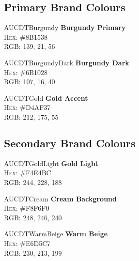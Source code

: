 \documentclass[a4paper, 11pt]{article}
\begin{document}
\subsection{Primary Brand Colours}
\begin{center}
    \begin{tcbraster}[raster columns=3, raster equal height, raster column skip=5mm]
        \begin{colorswatch}{AUCDTBurgundy}
            \textbf{Burgundy Primary} \\ \textsc{Hex:} \#8B1538 \\ \textsc{RGB:} 139, 21, 56
        \end{colorswatch}
        \begin{colorswatch}{AUCDTBurgundyDark}
             \textbf{Burgundy Dark} \\ \textsc{Hex:} \#6B1028 \\ \textsc{RGB:} 107, 16, 40
        \end{colorswatch}
        \begin{colorswatch}[coltext=AUCDTPrimaryText]{AUCDTGold}
             \textbf{Gold Accent} \\ \textsc{Hex:} \#D4AF37 \\ \textsc{RGB:} 212, 175, 55
        \end{colorswatch}
    \end{tcbraster}
\end{center}

\subsection{Secondary Brand Colours}
\begin{center}
    \begin{tcbraster}[raster columns=3, raster equal height, raster column skip=5mm]
        \begin{colorswatch}[coltext=AUCDTPrimaryText]{AUCDTGoldLight}
            \textbf{Gold Light} \\ \textsc{Hex:} \#F4E4BC \\ \textsc{RGB:} 244, 228, 188
        \end{colorswatch}
        \begin{colorswatch}[coltext=AUCDTPrimaryText]{AUCDTCream}
             \textbf{Cream Background} \\ \textsc{Hex:} \#F8F6F0 \\ \textsc{RGB:} 248, 246, 240
        \end{colorswatch}
        \begin{colorswatch}[coltext=AUCDTPrimaryText]{AUCDTWarmBeige}
             \textbf{Warm Beige} \\ \textsc{Hex:} \#E6D5C7 \\ \textsc{RGB:} 230, 213, 199
        \end{colorswatch}
    \end{tcbraster}
\end{center}
\end{document}
